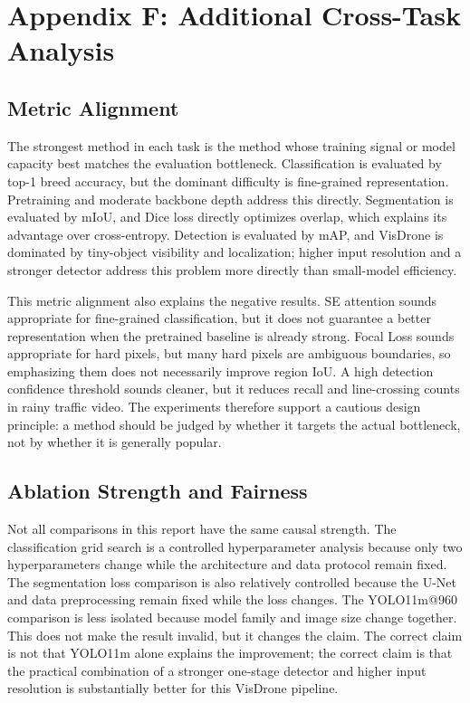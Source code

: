 \documentclass[10pt,twocolumn]{article}
\begin{document}
\section{Appendix F: Additional Cross-Task Analysis}

\subsection{Metric Alignment}

The strongest method in each task is the method whose training signal or model capacity best matches the evaluation bottleneck. Classification is evaluated by top-1 breed accuracy, but the dominant difficulty is fine-grained representation. Pretraining and moderate backbone depth address this directly. Segmentation is evaluated by mIoU, and Dice loss directly optimizes overlap, which explains its advantage over cross-entropy. Detection is evaluated by mAP, and VisDrone is dominated by tiny-object visibility and localization; higher input resolution and a stronger detector address this problem more directly than small-model efficiency.

This metric alignment also explains the negative results. SE attention sounds appropriate for fine-grained classification, but it does not guarantee a better representation when the pretrained baseline is already strong. Focal Loss sounds appropriate for hard pixels, but many hard pixels are ambiguous boundaries, so emphasizing them does not necessarily improve region IoU. A high detection confidence threshold sounds cleaner, but it reduces recall and line-crossing counts in rainy traffic video. The experiments therefore support a cautious design principle: a method should be judged by whether it targets the actual bottleneck, not by whether it is generally popular.

\subsection{Ablation Strength and Fairness}

Not all comparisons in this report have the same causal strength. The classification grid search is a controlled hyperparameter analysis because only two hyperparameters change while the architecture and data protocol remain fixed. The segmentation loss comparison is also relatively controlled because the U-Net and data preprocessing remain fixed while the loss changes. The YOLO11m@960 comparison is less isolated because model family and image size change together. This does not make the result invalid, but it changes the claim. The correct claim is not that YOLO11m alone explains the improvement; the correct claim is that the practical combination of a stronger one-stage detector and higher input resolution is substantially better for this VisDrone pipeline.
\end{document}
